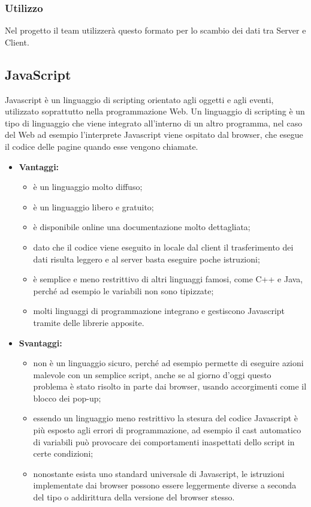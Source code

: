 	\subsubsection{Utilizzo}
	Nel progetto il team utilizzerà questo formato per lo scambio dei dati tra Server e Client.

\subsection{JavaScript}

	Javascript è un linguaggio di scripting orientato agli oggetti e agli eventi, utilizzato soprattutto nella programmazione Web. Un linguaggio di scripting è un tipo di linguaggio che viene integrato all'interno di un altro programma, nel caso del Web ad esempio l'interprete Javascript viene ospitato dal browser, che esegue il codice delle pagine quando esse vengono chiamate.

	\begin{itemize}
		\item \textbf{Vantaggi:}
			\begin{itemize}
				\item è un linguaggio molto diffuso;
				\item è un linguaggio libero e gratuito;
				\item è disponibile online una documentazione molto dettagliata;
				\item dato che il codice viene eseguito in locale dal client il trasferimento dei dati risulta leggero e al server basta eseguire poche istruzioni;
				\item è semplice e meno restrittivo di altri linguaggi famosi, come C++ e Java, perché ad esempio le variabili non sono tipizzate;
				\item molti linguaggi di programmazione integrano e gestiscono Javascript tramite delle librerie apposite.
			\end{itemize}
		\item \textbf{Svantaggi:}
			\begin{itemize}
				\item non è un linguaggio sicuro, perché ad esempio permette di eseguire azioni malevole con un semplice script, anche se al giorno d'oggi questo problema è stato risolto in parte dai browser, usando accorgimenti come il blocco dei pop-up;
				\item essendo un linguaggio meno restrittivo la stesura del codice Javascript è più esposto agli errori di programmazione, ad esempio il cast automatico di variabili può provocare dei comportamenti inaspettati dello script in certe condizioni;
				\item nonostante esista uno standard universale di Javascript, le istruzioni implementate dai browser possono essere leggermente diverse a seconda del tipo o addirittura della versione del browser stesso.
			\end{itemize}
	\end{itemize}
